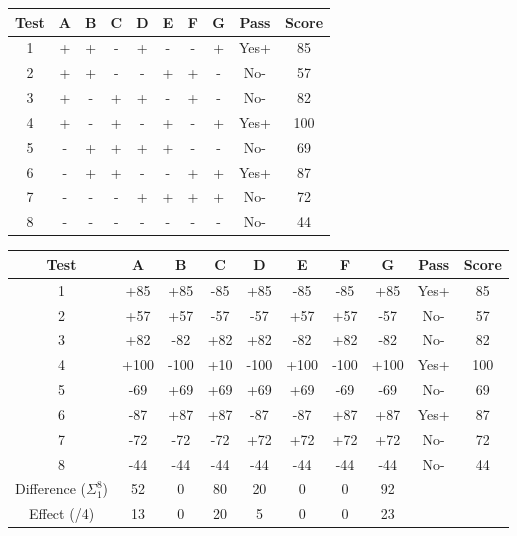 \documentclass[oneside]{book}
\begin{document}
\begin{table}[H]
	\begin{center}
\begin{tabular}{|c|c|c|c|c|c|c|c|c|c|}
	\hline Test & A & B & C & D & E & F & G & Pass & Score \\
	\hline 1 & + & + & - & + & - & - & + & Yes+& 85 \\
	\hline 2 & + & + & - & - & + & + & - & No- & 57 \\
	\hline 3 & + & - & + & + & - & + & - & No- & 82 \\
	\hline 4 & + & - & + & - & + & - & + & Yes+& 100 \\
	\hline 5 & - & + & + & + & + & - & - & No- & 69 \\
	\hline 6 & - & + & + & - & - & + & + & Yes+& 87 \\
	\hline 7 & - & - & - & + & + & + & + & No- & 72 \\
	\hline 8 & - & - & - & - & - & - & - & No- & 44 \\
	\hline
\end{tabular}
\end{center}
\end{table}


\begin{table}[H]
	\begin{center}
		\begin{tabular}{|c|c|c|c|c|c|c|c|c|c|}
			\hline Test & A & B & C & D & E & F & G & Pass & Score \\
			\hline 1 & +85 & +85 & -85 & +85 & -85 & -85 & +85 & Yes+& 85 \\
			\hline 2 & +57 & +57 & -57 & -57 & +57 & +57 & -57 & No- & 57 \\
			\hline 3 & +82 & -82 & +82 & +82 & -82 & +82 & -82 & No- & 82 \\
			\hline 4 & +100 & -100 & +10 & -100 & +100 & -100 & +100 & Yes+& 100 \\
			\hline 5 & -69 & +69 & +69 & +69 & +69 & -69 & -69 & No- & 69 \\
			\hline 6 & -87 & +87 & +87 & -87 & -87 & +87 & +87 & Yes+& 87 \\
			\hline 7 & -72 & -72 & -72 & +72 & +72& +72 & +72 & No- & 72 \\
			\hline 8 & -44 & -44 & -44 & -44 & -44 & -44 & -44 & No- & 44 \\
			\hline 
			\hline Difference ($\Sigma_1^8$) & 52 & 0 & 80 & 20 & 0 & 0 & 92 &  &  \\
			\hline Effect (/4) & 13 & 0 & 20 & 5 & 0 & 0 & 23 & & \\
			\hline
		\end{tabular}
	\end{center}
\end{table}
\end{document}
